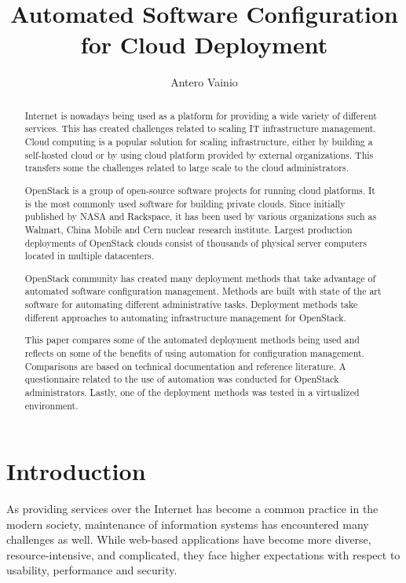 \documentclass[officiallayout]{tktla}
\title{Automated Software Configuration for Cloud Deployment}
\author{Antero Vainio}
\begin{document}
\frontmatter

\maketitle

\begin{abstract}

Internet is nowadays being used as a platform for providing a wide variety of
different services. This has created challenges related to scaling IT
infrastructure management. Cloud computing is a popular solution for scaling
infrastructure, either by building a self-hosted cloud or by using cloud
platform provided by external organizations. This transfers some the challenges
related to large scale to the cloud administrators.

OpenStack is a group of open-source software projects for running cloud
platforms. It is the most commonly used software for building private clouds.
Since initially published by NASA and Rackspace, it has been used by various
organizations such as Walmart, China Mobile and Cern nuclear research
institute. Largest production deployments of OpenStack clouds consist of
thousands of physical server computers located in multiple datacenters.

OpenStack community has created many deployment methods that take advantage of
automated software configuration management. Methods are built with state of
the art software for automating different administrative tasks. Deployment
methods take different approaches to automating infrastructure management for
OpenStack.

This paper compares some of the automated deployment methods being used and
reflects on some of the benefits of using automation for configuration
management. Comparisons are based on technical documentation and reference
literature. A questionnaire related to the use of automation was conducted for
OpenStack administrators. Lastly, one of the deployment methods was tested in a
virtualized environment.

\end{abstract}

\tableofcontents

\mainmatter

\chapter{Introduction}

As providing services over the Internet has become a common practice in the
modern society, maintenance of information systems has encountered many
challenges as well. While web-based applications have become more diverse,
resource-intensive, and complicated, they face higher expectations with respect
to usability, performance and security.
\end{document}
